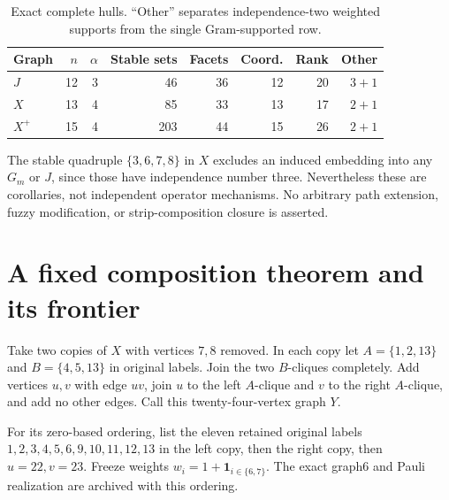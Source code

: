 \documentclass[11pt,a4paper]{article}
\theoremstyle{remark}\newtheorem{remark}[theorem]{Remark}
\begin{document}
\begin{table}[ht]\centering\small
\begin{tabular}{lrrrrrrr}
\toprule Graph & $n$ & $\alpha$ & Stable sets & Facets & Coord. & Rank & Other\\\midrule
$J$ & 12 & 3 & 46 & 36 & 12 & 20 & $3+1$\\
$X$ & 13 & 4 & 85 & 33 & 13 & 17 & $2+1$\\
$X^+$ & 15 & 4 & 203 & 44 & 15 & 26 & $2+1$\\\bottomrule
\end{tabular}
\caption{Exact complete hulls. ``Other'' separates independence-two
weighted supports from the single Gram-supported row.}\label{tab:hulls}
\end{table}
The stable quadruple $\{3,6,7,8\}$ in $X$ excludes an induced embedding
into any $G_m$ or $J$, since those have independence number three.
Nevertheless these are corollaries, not independent operator mechanisms.
No arbitrary path extension, fuzzy modification, or strip-composition
closure is asserted.

\section{A fixed composition theorem and its frontier}\label{sec:frontier}
Take two copies of $X$ with vertices $7,8$ removed. In each copy let
$A=\{1,2,13\}$ and $B=\{4,5,13\}$ in original labels. Join the two
$B$-cliques completely. Add vertices $u,v$ with edge $uv$, join $u$ to
the left $A$-clique and $v$ to the right $A$-clique, and add no other
edges. Call this twenty-four-vertex graph $Y$.

For its zero-based ordering, list the eleven retained original labels
$1,2,3,4,5,6,9,10,11,12,13$ in the left copy, then the right copy, then
$u=22,v=23$. Freeze weights $w_i=1+\mathbf1_{i\in\{6,7\}}$.
The exact graph6 and Pauli realization are archived with this ordering.
\end{document}
